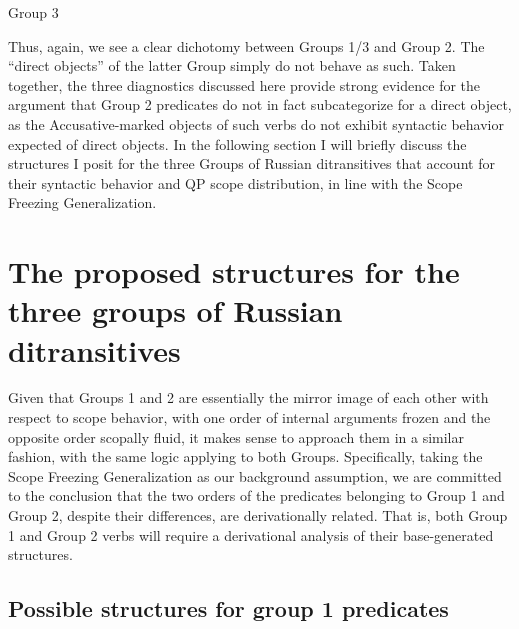 \documentclass[output=paper,colorlinks,citecolor=brown,modfonts,nonflat]{langsci/langscibook}
\begin{document}
\ea%
    \label{ex:antonyuk:46}
     {Group 3}
    \z
\z

Thus, again, we see a clear dichotomy between Groups 1/3 and Group 2. The “direct objects” of the latter Group simply do not behave as such. Taken together, the three diagnostics discussed here provide strong evidence for the argument that Group 2 predicates do not in fact subcategorize for a direct object, as the Accusative-marked objects of such verbs do not exhibit syntactic behavior expected of direct objects. In the following section I will briefly discuss the structures I posit for the three Groups of Russian ditransitives that account for their syntactic behavior and QP scope distribution, in line with the Scope Freezing Generalization.


\section{The proposed structures for the three groups of Russian ditransitives}\label{sec:antonyuk:4}

Given that Groups 1 and 2 are essentially the mirror image of each other with respect to scope behavior, with one order of internal arguments frozen and the opposite order scopally fluid, it makes sense to approach them in a similar fashion, with the same logic applying to both Groups. Specifically, taking the Scope Freezing Generalization as our background assumption, we are committed to the conclusion that the two orders of the predicates belonging to Group 1 and Group 2, despite their differences, are derivationally related. That is, both Group 1 and Group 2 verbs will require a derivational analysis of their base-generated structures.

\subsection{Possible structures for group 1 predicates}\label{sec:antonyuk:4.1}
\end{document}
